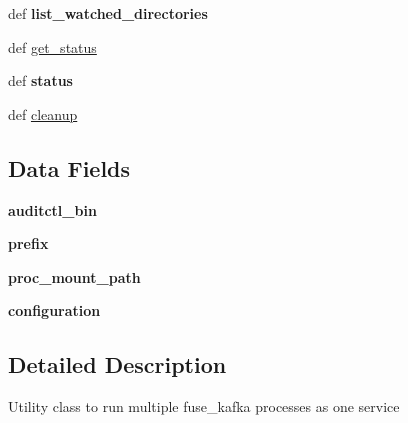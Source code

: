 \begin{DoxyCompactItemize}
\item 
\hypertarget{classfuse__kafka_1_1FuseKafkaService_aa7dd2095cfc8b080fba7047654e92eb9}{def {\bfseries list\-\_\-watched\-\_\-directories}}\label{classfuse__kafka_1_1FuseKafkaService_aa7dd2095cfc8b080fba7047654e92eb9}

\item 
def \hyperlink{classfuse__kafka_1_1FuseKafkaService_a6e9278183d970e683d7060610bb9bc6f}{get\-\_\-status}
\item 
\hypertarget{classfuse__kafka_1_1FuseKafkaService_a0289d64b6f56aef8b710466042ada3d1}{def {\bfseries status}}\label{classfuse__kafka_1_1FuseKafkaService_a0289d64b6f56aef8b710466042ada3d1}

\item 
def \hyperlink{classfuse__kafka_1_1FuseKafkaService_a9cf98c6a35fb986e6877dfdca61630c0}{cleanup}
\end{DoxyCompactItemize}
\subsection*{\-Data \-Fields}
\begin{DoxyCompactItemize}
\item 
\hypertarget{classfuse__kafka_1_1FuseKafkaService_af430312adb56c1dc5af6974b045708a8}{{\bfseries auditctl\-\_\-bin}}\label{classfuse__kafka_1_1FuseKafkaService_af430312adb56c1dc5af6974b045708a8}

\item 
\hypertarget{classfuse__kafka_1_1FuseKafkaService_ae104081d0b1ec3c4c44cfd4ccf75b01e}{{\bfseries prefix}}\label{classfuse__kafka_1_1FuseKafkaService_ae104081d0b1ec3c4c44cfd4ccf75b01e}

\item 
\hypertarget{classfuse__kafka_1_1FuseKafkaService_a1238f08c265e4c19a8a721f57bd7dafe}{{\bfseries proc\-\_\-mount\-\_\-path}}\label{classfuse__kafka_1_1FuseKafkaService_a1238f08c265e4c19a8a721f57bd7dafe}

\item 
\hypertarget{classfuse__kafka_1_1FuseKafkaService_afd89f62981d0dcbb3efee6f56c949642}{{\bfseries configuration}}\label{classfuse__kafka_1_1FuseKafkaService_afd89f62981d0dcbb3efee6f56c949642}

\end{DoxyCompactItemize}


\subsection{\-Detailed \-Description}
\begin{DoxyVerb}Utility class to run multiple fuse_kafka processes as one service \end{DoxyVerb}
 

